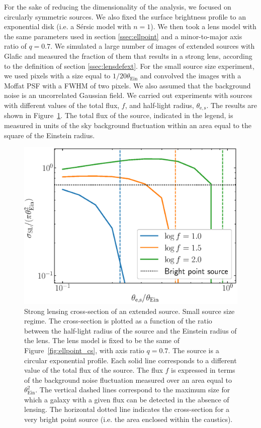\documentclass{aa}
\def\tein{\theta_{\mathrm{Ein}}}
\def\Fref#1{Figure~\ref{#1}\xspace}
\begin{document}
For the sake of reducing the dimensionality of the analysis, we focused on circularly symmetric sources. We also fixed the surface brightness profile to an exponential disk (i.e. a S\'{e}rsic model with $n=1$).
We then took a lens model with the same parameters used in section \ref{ssec:ellpoint} and a minor-to-major axis ratio of $q=0.7$.
We simulated a large number of images of extended sources with {\sc Glafic} and measured the fraction of them that results in a strong lens, according to the definition of section \ref{ssec:lensdefext}.
For the small source size experiment, we used pixels with a size equal to $1/20\tein$ and convolved the images with a Moffat PSF with a FWHM of two pixels.
We also assumed that the background noise is an uncorrelated Gaussian field.
We carried out experiments with sources with different values of the total flux, $f$, and half-light radius, $\theta_{\mathrm{e,s}}$.
The results are shown in \Fref{fig:extcs}.
The total flux of the source, indicated in the legend, is measured in units of the sky background fluctuation within an area equal to the square of the Einstein radius.

\begin{figure}
\includegraphics[width=\columnwidth]{ell_ext_cs.eps}
\caption{
Strong lensing cross-section of an extended source.
Small source size regime.
The cross-section is plotted as a function of the ratio between the half-light radius of the source and the Einstein radius of the lens.
The lens model is fixed to be the same of \Fref{fig:ellpoint_cs}, with axis ratio $q=0.7$. The source is a circular exponential profile.
Each solid line corresponds to a different value of the total flux of the source. The flux $f$ is expressed in terms of the background noise fluctuation measured over an area equal to $\tein^2$.
The vertical dashed lines correspond to the maximum size for which a galaxy with a given flux can be detected in the absence of lensing.
The horizontal dotted line indicates the cross-section for a very bright point source (i.e. the area enclosed within the caustics).
\label{fig:extcs}
}
\end{figure}
\end{document}
